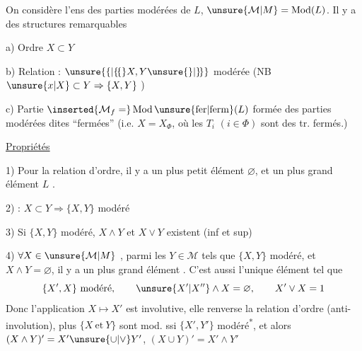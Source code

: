 On considère l'ens   des parties modérées de $L$, $\unsure{\mathcal M|M}=\operatorname{Mod}(L)$. Il y a des structures remarquables

a) Ordre \quad $X\subset Y$

b) Relation : $\unsure{\{|\lbrace\!\lbrace}X,Y\unsure{\}|\rbrace\!\rbrace}$ modérée \quad (NB $\unsure{x|X}\subset Y\Rightarrow\{X,Y\}$ )

c) Partie $\inserted{\mathcal M_f=}\operatorname{Mod}\unsure{\mathrm{fer}|\mathrm{ferm}}(L)$ formée des parties modérées dites ``fermées'' (i.e. $X=X_{\Phi}$, où les $T_i$ $(i\in\Phi)$ sont des  tr. fermés.)

\uline{Propriétés}

1) Pour la relation d'ordre, il y a un plus petit élément $\varnothing$, et un plus grand élément $L$ .

2) : $X\subset Y\Rightarrow\{X,Y\}$ modéré

3) Si $\{X,Y\}$ modéré, $X\wedge Y$ et $X\vee Y$ existent (inf et sup)

  

4)  $\forall X\in\unsure{\mathcal M|M}$ ,  parmi les $Y\in\mathcal M$ tels que $\{X,Y\}$ modéré, et $X\wedge Y=\varnothing$, il y a un plus grand élément . C'est aussi l'unique élément tel que
\[
\{X',X\}\text{ modéré},\qquad \unsure{X'|X''}\wedge X=\varnothing,\qquad X'\vee X=1
\]
Donc l'application $X\mapsto X'$ est involutive, elle renverse la relation d'ordre (anti-involution),   plus $\{X\ \mathrm{et}\ Y\}$ sont mod. ssi $\{X',Y'\}$ modéré\textsuperscript{*},
et alors \quad $(X\wedge Y)'=X'\unsure{\cup|\vee}Y'$, \quad $(X\cup Y)'=X'\wedge Y'$

